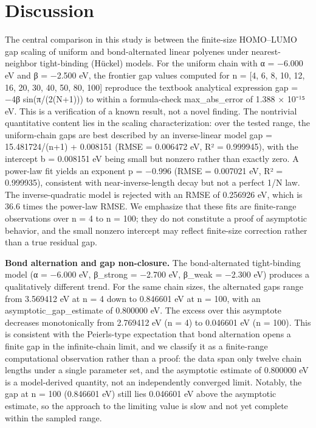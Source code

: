 \documentclass[11pt,a4paper]{article}
\begin{document}
\section{Discussion}
The central comparison in this study is between the finite-size HOMO–LUMO gap scaling of uniform and bond-alternated linear polyenes under nearest-neighbor tight-binding (Hückel) models. For the uniform chain with α = −6.000 eV and β = −2.500 eV, the frontier gap values computed for n = [4, 6, 8, 10, 12, 16, 20, 30, 40, 50, 80, 100] reproduce the textbook analytical expression gap = −4β sin(π/(2(N+1))) to within a formula-check max\_abs\_error of 1.388 × 10⁻¹⁵ eV. This is a verification of a known result, not a novel finding. The nontrivial quantitative content lies in the scaling characterization: over the tested range, the uniform-chain gaps are best described by an inverse-linear model gap = 15.481724/(n+1) + 0.008151 (RMSE = 0.006472 eV, R² = 0.999945), with the intercept b = 0.008151 eV being small but nonzero rather than exactly zero. A power-law fit yields an exponent p = −0.996 (RMSE = 0.007021 eV, R² = 0.999935), consistent with near-inverse-length decay but not a perfect 1/N law. The inverse-quadratic model is rejected with an RMSE of 0.256926 eV, which is 36.6 times the power-law RMSE. We emphasize that these fits are finite-range observations over n = 4 to n = 100; they do not constitute a proof of asymptotic behavior, and the small nonzero intercept may reflect finite-size correction rather than a true residual gap.

\textbf{Bond alternation and gap non-closure.} The bond-alternated tight-binding model (α = −6.000 eV, β\_strong = −2.700 eV, β\_weak = −2.300 eV) produces a qualitatively different trend. For the same chain sizes, the alternated gaps range from 3.569412 eV at n = 4 down to 0.846601 eV at n = 100, with an asymptotic\_gap\_estimate of 0.800000 eV. The excess over this asymptote decreases monotonically from 2.769412 eV (n = 4) to 0.046601 eV (n = 100). This is consistent with the Peierls-type expectation that bond alternation opens a finite gap in the infinite-chain limit, and we classify it as a finite-range computational observation rather than a proof: the data span only twelve chain lengths under a single parameter set, and the asymptotic estimate of 0.800000 eV is a model-derived quantity, not an independently converged limit. Notably, the gap at n = 100 (0.846601 eV) still lies 0.046601 eV above the asymptotic estimate, so the approach to the limiting value is slow and not yet complete within the sampled range.
\end{document}
